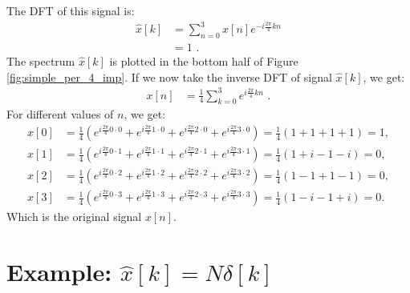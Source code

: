 The DFT of this signal is:
\begin{align}
  \hat{x}[k] & = \sum_{n=0}^{3} x[n] e^{-i\frac{2\pi}{4}kn} \\
             & = 1 \,\,.
\end{align}
The spectrum $\hat{x}[k]$ is plotted in the bottom half of Figure \ref{fig:simple_per_4_imp}.
If we now take the inverse DFT of signal $\hat{x}[k]$, we get:
\begin{align}
  x[n] & = \frac{1}{4}\sum_{k=0}^{3} e^{i\frac{2\pi}{4}kn} \,\,.
\end{align}
For different values of $n$, we get:
\begin{align*}
  x[0] & = \frac{1}{4}(e^{i\frac{2\pi}{4}0\cdot 0} + e^{i\frac{2\pi}{4}1\cdot 0} + e^{i\frac{2\pi}{4}2\cdot 0} + e^{i\frac{2\pi}{4}3\cdot 0})=\frac{1}{4}(1 + 1 + 1 + 1) = 1,   \\
  x[1] & = \frac{1}{4}(e^{i\frac{2\pi}{4}0\cdot 1} + e^{i\frac{2\pi}{4}1\cdot 1} + e^{i\frac{2\pi}{4}2\cdot 1} + e^{i\frac{2\pi}{4}3\cdot 1}) = \frac{1}{4}(1 + i - 1 - i) = 0, \\
  x[2] & = \frac{1}{4}(e^{i\frac{2\pi}{4}0\cdot 2} + e^{i\frac{2\pi}{4}1\cdot 2} + e^{i\frac{2\pi}{4}2\cdot 2} + e^{i\frac{2\pi}{4}3\cdot 2}) = \frac{1}{4}(1 -1  + 1  -1) = 0, \\
  x[3] & = \frac{1}{4}(e^{i\frac{2\pi}{4}0\cdot 3} + e^{i\frac{2\pi}{4}1\cdot 3} + e^{i\frac{2\pi}{4}2\cdot 3} + e^{i\frac{2\pi}{4}3\cdot 3}) = \frac{1}{4}(1 - i - 1 + i) = 0.
\end{align*}
Which is the original signal $x[n]$.

  \section{Example: $\hat{x}[k] = N\delta[k]$}

